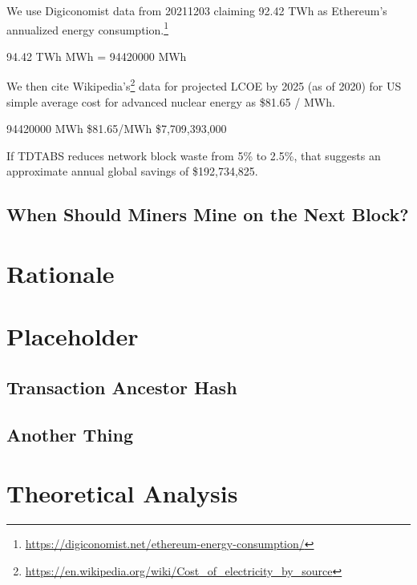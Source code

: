 \documentclass[11pt]{article}
\theoremstyle{plain}
\begin{document}
{We use Digiconomist data from 20211203 claiming 92.42 TWh as Ethereum's
annualized energy
consumption.\footnote{\url{https://digiconomist.net/ethereum-energy-consumption/}}

94.42 TWh \rightarrow MWh = 94420000 MWh

We then cite
Wikipedia's\footnote{\url{https://en.wikipedia.org/wiki/Cost_of_electricity_by_source}} data for projected LCOE by 2025 (as of 2020) for US simple average cost for
advanced nuclear energy as \$81.65 / MWh.

94420000 MWh \times \$81.65/MWh \equiv \$7,709,393,000

If TDTABS reduces network block waste from 5\% to 2.5\%, that suggests an
approximate annual global savings of \$192,734,825.




\subsection{\normalsize{When Should Miners Mine on the Next Block?}}

\pagebreak
\section{\normalsize{Rationale}}

\pagebreak
\section{Placeholder}
\subsection{\normalsize{Transaction Ancestor Hash}}


\subsection{\normalsize{Another Thing}}

\pagebreak
\section{\normalsize{Theoretical Analysis}}

}
\end{document}
